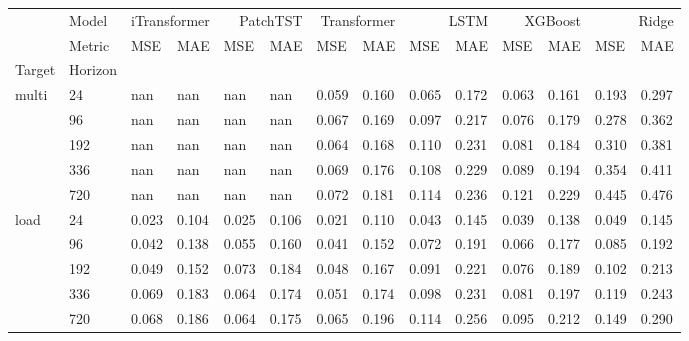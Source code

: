 \begin{tabular}{llllllllllllll}
\toprule
 & Model & \multicolumn{2}{r}{iTransformer} & \multicolumn{2}{r}{PatchTST} & \multicolumn{2}{r}{Transformer} & \multicolumn{2}{r}{LSTM} & \multicolumn{2}{r}{XGBoost} & \multicolumn{2}{r}{Ridge} \\
 & Metric & MSE & MAE & MSE & MAE & MSE & MAE & MSE & MAE & MSE & MAE & MSE & MAE \\
Target & Horizon &  &  &  &  &  &  &  &  &  &  &  &  \\
\midrule
\multirow[t]{5}{*}{multi} & 24 & nan & nan & nan & nan & 0.059 & 0.160 & 0.065 & 0.172 & 0.063 & 0.161 & 0.193 & 0.297 \\
 & 96 & nan & nan & nan & nan & 0.067 & 0.169 & 0.097 & 0.217 & 0.076 & 0.179 & 0.278 & 0.362 \\
 & 192 & nan & nan & nan & nan & 0.064 & 0.168 & 0.110 & 0.231 & 0.081 & 0.184 & 0.310 & 0.381 \\
 & 336 & nan & nan & nan & nan & 0.069 & 0.176 & 0.108 & 0.229 & 0.089 & 0.194 & 0.354 & 0.411 \\
 & 720 & nan & nan & nan & nan & 0.072 & 0.181 & 0.114 & 0.236 & 0.121 & 0.229 & 0.445 & 0.476 \\
\cline{1-14}
\multirow[t]{5}{*}{load} & 24 & 0.023 & 0.104 & 0.025 & 0.106 & 0.021 & 0.110 & 0.043 & 0.145 & 0.039 & 0.138 & 0.049 & 0.145 \\
 & 96 & 0.042 & 0.138 & 0.055 & 0.160 & 0.041 & 0.152 & 0.072 & 0.191 & 0.066 & 0.177 & 0.085 & 0.192 \\
 & 192 & 0.049 & 0.152 & 0.073 & 0.184 & 0.048 & 0.167 & 0.091 & 0.221 & 0.076 & 0.189 & 0.102 & 0.213 \\
 & 336 & 0.069 & 0.183 & 0.064 & 0.174 & 0.051 & 0.174 & 0.098 & 0.231 & 0.081 & 0.197 & 0.119 & 0.243 \\
 & 720 & 0.068 & 0.186 & 0.064 & 0.175 & 0.065 & 0.196 & 0.114 & 0.256 & 0.095 & 0.212 & 0.149 & 0.290 \\
\cline{1-14}
\bottomrule
\end{tabular}
